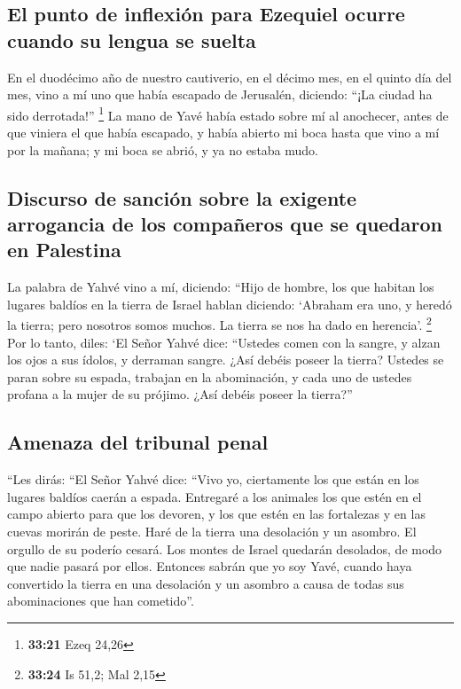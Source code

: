 \hypertarget{el-punto-de-inflexiuxf3n-para-ezequiel-ocurre-cuando-su-lengua-se-suelta}{%
\subsection{El punto de inflexión para Ezequiel ocurre cuando su lengua
se
suelta}\label{el-punto-de-inflexiuxf3n-para-ezequiel-ocurre-cuando-su-lengua-se-suelta}}

 En el duodécimo año de nuestro cautiverio, en el décimo
mes, en el quinto día del mes, vino a mí uno que había escapado de
Jerusalén, diciendo: ``¡La ciudad ha sido derrotada!'' \footnote{\textbf{33:21}
  Ezeq 24,26}  La mano de Yavé había estado sobre mí al
anochecer, antes de que viniera el que había escapado, y había abierto
mi boca hasta que vino a mí por la mañana; y mi boca se abrió, y ya no
estaba mudo.

\hypertarget{discurso-de-sanciuxf3n-sobre-la-exigente-arrogancia-de-los-compauxf1eros-que-se-quedaron-en-palestina}{%
\subsection{Discurso de sanción sobre la exigente arrogancia de los
compañeros que se quedaron en
Palestina}\label{discurso-de-sanciuxf3n-sobre-la-exigente-arrogancia-de-los-compauxf1eros-que-se-quedaron-en-palestina}}

 La palabra de Yahvé vino a mí, diciendo: 
``Hijo de hombre, los que habitan los lugares baldíos en la tierra de
Israel hablan diciendo: `Abraham era uno, y heredó la tierra; pero
nosotros somos muchos. La tierra se nos ha dado en herencia'.
\footnote{\textbf{33:24} Is 51,2; Mal 2,15}  Por lo
tanto, diles: `El Señor Yahvé dice: ``Ustedes comen con la sangre, y
alzan los ojos a sus ídolos, y derraman sangre. ¿Así debéis poseer la
tierra?  Ustedes se paran sobre su espada, trabajan en la
abominación, y cada uno de ustedes profana a la mujer de su prójimo.
¿Así debéis poseer la tierra?''

\hypertarget{amenaza-del-tribunal-penal}{%
\subsection{Amenaza del tribunal
penal}\label{amenaza-del-tribunal-penal}}

 ``Les dirás: ``El Señor Yahvé dice: ``Vivo yo,
ciertamente los que están en los lugares baldíos caerán a espada.
Entregaré a los animales los que estén en el campo abierto para que los
devoren, y los que estén en las fortalezas y en las cuevas morirán de
peste.  Haré de la tierra una desolación y un asombro. El
orgullo de su poderío cesará. Los montes de Israel quedarán desolados,
de modo que nadie pasará por ellos.  Entonces sabrán que
yo soy Yavé, cuando haya convertido la tierra en una desolación y un
asombro a causa de todas sus abominaciones que han cometido''.

